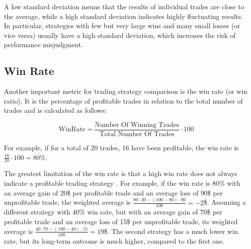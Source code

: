 \noindent
A low standard deviation means that the results of individual trades are close to the average, while a high standard deviation indicates highly fluctuating results.
In particular, strategies with few but very large wins and many small losses (or vice versa) usually have a high standard deviation, which increases the risk of performance misjudgment.

\subsection{Win Rate}
\label{chap:win-rate}

Another important metric for trading strategy comparison is the win rate (or win ratio).
It is the percentage of profitable trades in relation to the total number of trades and is calculated as follows:

\[
    \text{WinRate} = \frac{\text{Number Of Winning Trades}}{\text{Total Number Of Trades}} \cdot 100
\]

\noindent
For example, if for a total of 20 trades, 16 have been profitable, the win rate is $\frac{16}{20} \cdot 100 = 80\%$.

The greatest limitation of the win rate is that a high win rate does not always indicate a profitable trading strategy \cite{win-rate}.
For example, if the win rate is 80\% with an average gain of 20\$ per profitable trade and an average loss of 90\$ per unprofitable trade, the weighted average is $\frac{80 \cdot 20 - (100 - 80) \cdot 90}{100} = -2$\$.
Assuming a different strategy with 40\% win rate, but with an average gain of 70\$ per profitable trade and an average loss of 15\$ per unprofitable trade, its weighted average is $\frac{40 \cdot 70 - (100 - 40) \cdot 15}{100} = 19$\$.
The second strategy has a much lower win rate, but its long-term outcome is much higher, compared to the first one.